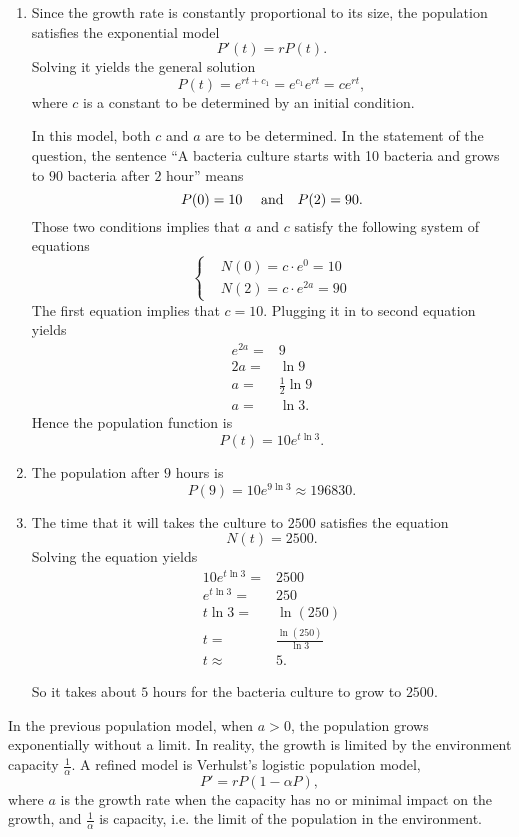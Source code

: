 \begin{solution}
	\begin{enumerate}
		\item Since the growth rate is constantly proportional to its size, the population satisfies the exponential model
		\[P'(t)=rP(t).\]
		Solving it yields the general solution
    \[P(t)=e^{rt+c_1}=e^{c_1}e^{rt}=ce^{rt},\]
		where $c$ is a constant to be determined by an initial condition.
		
		In this model, both $c$ and $a$ are to be determined. In the statement of the question, the sentence ``A bacteria culture starts with 10 bacteria and grows to $90$ bacteria after $2$ hour'' means 
		\[P(0)=10\quad\textup{ and}\quad P(2)=90.\]
  Those two conditions implies that $a$ and $c$ satisfy the following system of equations
		\[
			\begin{cases}
				& N(0)=c\cdot e^0=10\\[0.5em]
				& N(2)=c\cdot e^{2a}=90
      \end{cases}
		\]
    The first equation implies that $c=10$. Plugging it in to second equation yields
    \[
      \begin{aligned}
        e^{2a}=&9\\
        2a=&\ln9\\
        a=&\frac12\ln9\\
        a=&\ln3.
      \end{aligned}
    \]
  Hence the population function is 
  \[P(t)=10e^{t\ln3}.\]

		\item  The population after $9$ hours is
		\[P(9)=10e^{9\ln 3}\approx 196830.\]
		\item The time that it will takes the culture to $2500$ satisfies the equation \[N(t)=2500.\]
		Solving the equation yields
    \[
      \begin{aligned}
        10e^{t\ln3}=&2500\\
        e^{t\ln3}=&250\\
        t\ln3=&\ln(250)\\
        t=&\frac{\ln(250)}{\ln 3}\\
        t\approx & 5.
      \end{aligned}
    \]

    So it takes about $5$ hours for the bacteria culture to grow to $2500$.
	\end{enumerate}
\end{solution}

In the previous population model, when $a>0$, the population grows exponentially without a limit. In reality, the growth is limited by the environment capacity $\frac{1}{\alpha}$. A refined model is Verhulst's logistic population model, 
\[P'=rP(1-\alpha P),\]
where $a$ is the growth rate when the capacity has no or minimal impact on the growth, and $\frac1{\alpha}$ is capacity, i.e. the limit of the population in the environment.

